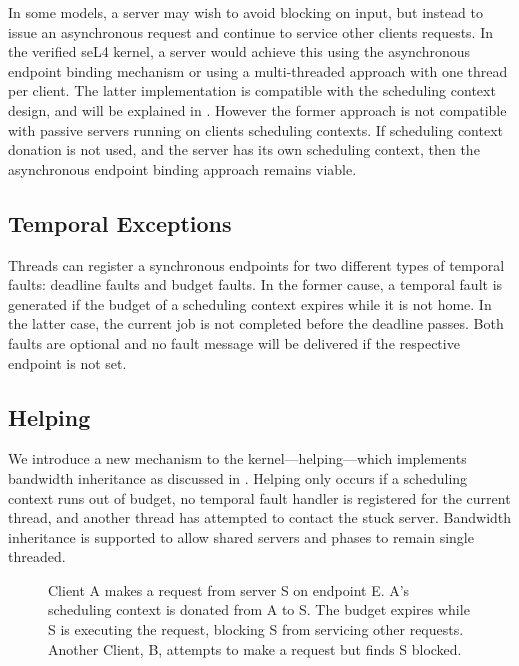 In some models, a server may wish to avoid blocking on input, but instead to issue an asynchronous request and continue to service other clients requests.
In the verified seL4 kernel, a server would achieve this using the asynchronous endpoint binding mechanism or using a multi-threaded approach with one thread per client.
The latter implementation is compatible with the scheduling context design, and will be explained in .
However the former approach is not compatible with passive servers running on clients scheduling contexts.
If scheduling context donation is not used, and the server has its own scheduling context, then the asynchronous endpoint binding approach remains viable.

\subsection{Temporal Exceptions}

Threads can register a synchronous endpoints for two different types of temporal faults: deadline faults and budget faults.
In the former cause, a temporal fault is generated if the budget of a scheduling context expires while it is not home.
In the latter case, the current job is not completed before the deadline passes.
Both faults are optional and no fault message will be delivered if the respective endpoint is not set.

\subsection{Helping}

We introduce a new mechanism to the kernel---helping---which implements bandwidth inheritance as discussed in .
Helping only occurs if a scheduling context runs out of budget, no temporal fault handler is registered for the current thread, and another thread has attempted to contact the stuck server.
Bandwidth inheritance is supported to allow shared servers and phases to remain single threaded.

\begin{figure}
\centering
\caption{Client A makes a request from server S on endpoint E. A's scheduling context is donated from A to S. The budget expires while S is executing the request, blocking S from servicing other requests. Another Client, B, attempts to make a request but finds S blocked.}
\label{fig:budget-expiry}
\end{figure}

